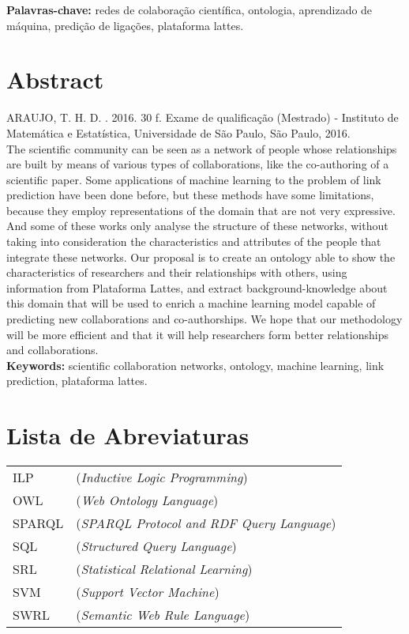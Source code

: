\documentclass[11pt,twoside,a4paper]{book}
\begin{document}
\noindent \textbf{Palavras-chave:} redes de colaboração científica, ontologia, aprendizado de máquina, predição de ligações, plataforma lattes.

\chapter*{Abstract}
\noindent ARAUJO, T. H. D. \textbf{\mydocumenttitle}.
2016. 30 f.
Exame de qualificação (Mestrado) - Instituto de Matemática e Estatística,
Universidade de São Paulo, São Paulo, 2016.
\\

The scientific community can be seen as a network of people whose relationships are built by means of various types of collaborations, like the co-authoring of a scientific paper. Some applications of machine learning to the problem of link prediction have been done before, but these methods have some limitations, because they employ representations of the domain that are not very expressive. And some of these works only analyse the structure of these networks, without taking into consideration the characteristics and attributes of the people that integrate these networks. Our proposal is to create an ontology able to show the characteristics of researchers and their relationships with others, using information from Plataforma Lattes, and extract background-knowledge about this domain that will be used to enrich a machine learning model capable of predicting new collaborations and co-authorships. We hope that our methodology will be more efficient and that it will help researchers form better relationships and collaborations.
\\

\noindent \textbf{Keywords:} scientific collaboration networks, ontology, machine learning, link prediction, plataforma lattes.


\tableofcontents    %

\chapter{Lista de Abreviaturas}
\begin{tabular}{ll}
        ILP         & (\textit{Inductive Logic Programming})\\
        OWL         & (\textit{Web Ontology Language})\\
        SPARQL      & (\textit{SPARQL Protocol and RDF Query Language})\\
        SQL         & (\textit{Structured Query Language})\\
        SRL         & (\textit{Statistical Relational Learning})\\
        SVM         & (\textit{Support Vector Machine})\\
        SWRL        & (\textit{Semantic Web Rule Language})\\
\end{tabular}
\end{document}
